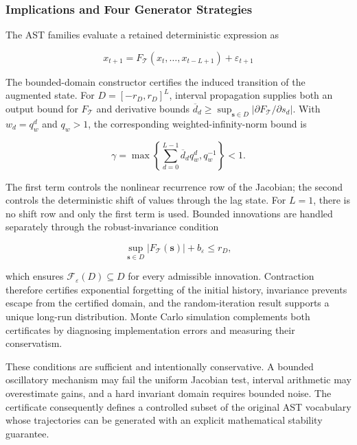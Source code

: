 \subsubsection{Implications and Four Generator Strategies}
\label{sec:four-generator-strategies}

The AST families evaluate a retained deterministic expression as

\begin{equation}
    x_{t+1}
    =F_{\mathcal T}(x_t,\ldots,x_{t-L+1})+\varepsilon_{t+1}
\end{equation}

The bounded-domain constructor certifies the induced transition of the
augmented state. For
$D=[-r_D,r_D]^L$, interval propagation supplies both an output bound for
$F_{\mathcal T}$ and derivative bounds
$\overline d_d\ge
\sup_{\mathbf{s}\in D}|\partial F_{\mathcal T}/\partial s_d|$. With
$w_d=q_w^d$ and $q_w>1$, the corresponding weighted-infinity-norm bound is

\begin{equation}
    \gamma
    =\max\!\left\{
      \sum_{d=0}^{L-1}\overline d_d q_w^d,
      q_w^{-1}
    \right\}<1.
\end{equation}

The first term controls the nonlinear recurrence row of the Jacobian; the
second controls the deterministic shift of values through the lag state.
For $L=1$, there is no shift row and only the first term is used.
Bounded innovations are handled separately through the robust-invariance
condition

\begin{equation}
    \sup_{\mathbf{s}\in D}|F_{\mathcal T}(\mathbf{s})|
    +b_{\varepsilon}
    \le r_D,
\end{equation}

which ensures $\mathcal F_{\varepsilon}(D)\subseteq D$ for every admissible
innovation. Contraction therefore certifies exponential forgetting of the
initial history, invariance prevents escape from the certified domain, and the
random-iteration result supports a unique long-run distribution. Monte Carlo
simulation complements both certificates by diagnosing implementation errors
and measuring their conservatism.

These conditions are sufficient and intentionally conservative. A bounded
oscillatory mechanism may fail the uniform Jacobian test, interval arithmetic
may overestimate gains, and a hard invariant domain requires bounded noise.
The certificate consequently defines a controlled subset of the original AST
vocabulary whose trajectories can be generated with an explicit mathematical
stability guarantee.

